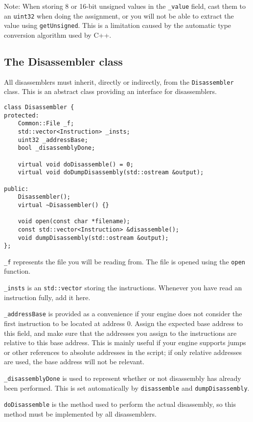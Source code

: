 Note: When storing 8 or 16-bit unsigned values in the \verb+_value+ field, cast them to an \verb+uint32+ when doing the assignment, or you will not be able to extract the value using \verb+getUnsigned+. This is a limitation caused by the automatic type conversion algorithm used by C++.

\subsection{The Disassembler class}
All disassemblers must inherit, directly or indirectly, from the \verb+Disassembler+ class. This is an abstract class providing an interface for disassemblers.

\begin{C++}
\begin{lstlisting}
class Disassembler {
protected:
	Common::File _f;
	std::vector<Instruction> _insts;
	uint32 _addressBase;
	bool _disassemblyDone;

	virtual void doDisassemble() = 0;
	virtual void doDumpDisassembly(std::ostream &output);

public:
	Disassembler();
	virtual ~Disassembler() {}

	void open(const char *filename);
	const std::vector<Instruction> &disassemble();
	void dumpDisassembly(std::ostream &output);
};
\end{lstlisting}
\end{C++}

\verb+_f+ represents the file you will be reading from. The file is opened using the \verb+open+ function.

\verb+_insts+ is an \verb+std::vector+ storing the instructions. Whenever you have read an instruction fully, add it here.

\verb+_addressBase+ is provided as a convenience if your engine does not consider the first instruction to be located at address 0. Assign the expected base address to this field, and make sure that the addresses you assign to the instructions are relative to this base address. This is mainly useful if your engine supports jumps or other references to absolute addresses in the script; if only relative addresses are used, the base address will not be relevant.

\verb+_disassemblyDone+ is used to represent whether or not disassembly has already been performed. This is set automatically by \verb+disassemble+ and  \verb+dumpDisassembly+.

\verb+doDisassemble+ is the method used to perform the actual disassembly, so this method must be implemented by all disassemblers.

